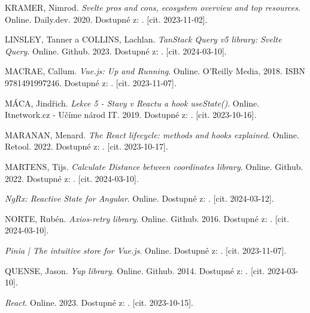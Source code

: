 \begin{thebibliography}{99}
\textsc{KRAMER}, Nimrod. \emph{Svelte pros and cons, ecosystem overview and top resources}. Online. Daily.dev. 2020. Dostupné z: . [cit. 2023-11-02].

\textsc{LINSLEY}, Tanner a \textsc{COLLINS}, Lachlan. \emph{TanStack Query v5 library: Svelte Query}. Online. Github. 2023. Dostupné z: . [cit. 2024-03-10].

\textsc{MACRAE}, Callum. \emph{Vue.js: Up and Running}. Online. O'Reilly Media, 2018. ISBN 9781491997246. Dostupné z: . [cit. 2023-11-07].

\textsc{MÁCA}, Jindřich. \emph{Lekce 5 - Stavy v Reactu a hook useState()}. Online. Itnetwork.cz - Učíme národ IT. 2019. Dostupné z: . [cit. 2023-10-16].

\textsc{MARANAN}, Menard. \emph{The React lifecycle: methods and hooks explained}. Online. Retool. 2022. Dostupné z: . [cit. 2023-10-17].

\textsc{MARTENS}, Tijs. \emph{Calculate Distance between coordinates library}. Online. Github. 2022. Dostupné z: . [cit. 2024-03-10].

\emph{NgRx: Reactive State for Angular}. Online. Dostupné z: . [cit. 2024-03-12].

\textsc{NORTE}, Rubén. \emph{Axios-retry library}. Online. Github. 2016. Dostupné z: . [cit. 2024-03-10].

\emph{Pinia | The intuitive store for Vue.js}. Online. Dostupné z: . [cit. 2023-11-07].

\textsc{QUENSE}, Jason. \emph{Yup library}. Online. Github. 2014. Dostupné z: . [cit. 2024-03-10].

\emph{React}. Online. 2023. Dostupné z: . [cit. 2023-10-15].


\end{thebibliography}
